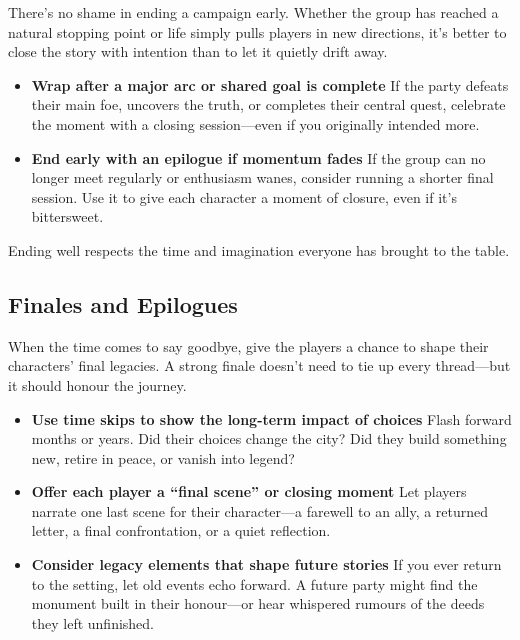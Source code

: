 There’s no shame in ending a campaign early. Whether the group has reached a natural stopping point or life simply pulls players in new directions, it’s better to close the story with intention than to let it quietly drift away.

\begin{itemize}
    \item \textbf{Wrap after a major arc or shared goal is complete}  
    If the party defeats their main foe, uncovers the truth, or completes their central quest, celebrate the moment with a closing session—even if you originally intended more.

    \item \textbf{End early with an epilogue if momentum fades}  
    If the group can no longer meet regularly or enthusiasm wanes, consider running a shorter final session. Use it to give each character a moment of closure, even if it’s bittersweet.
\end{itemize}

Ending well respects the time and imagination everyone has brought to the table.

\subsection*{Finales and Epilogues}

When the time comes to say goodbye, give the players a chance to shape their characters’ final legacies. A strong finale doesn’t need to tie up every thread—but it should honour the journey.

\begin{itemize}\raggedright
    \item \textbf{Use time skips to show the long-term impact of choices}  
    Flash forward months or years. Did their choices change the city? Did they build something new, retire in peace, or vanish into legend?

    \item \textbf{Offer each player a “final scene” or closing moment}  
    Let players narrate one last scene for their character—a farewell to an ally, a returned letter, a final confrontation, or a quiet reflection.

    \item \textbf{Consider legacy elements that shape future stories}  
    If you ever return to the setting, let old events echo forward. A future party might find the monument built in their honour—or hear whispered rumours of the deeds they left unfinished.
\end{itemize}


